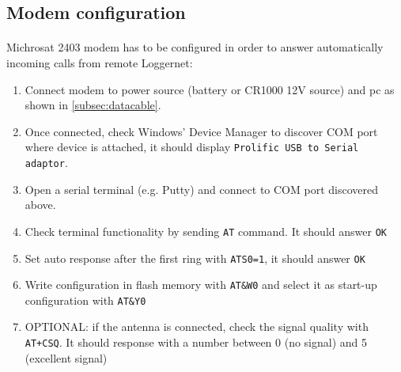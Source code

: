 \subsection{Modem configuration}
\paragraph{} Michrosat 2403 modem has to be configured in order to answer automatically incoming calls from remote Loggernet:
\begin{enumerate}
	\item Connect modem to power source (battery or CR1000 12V source) and pc as shown in \ref{subsec:datacable}.
	\item Once connected, check Windows' Device Manager to discover COM port where device is attached, it should display {\tt Prolific USB to Serial adaptor}.
	\item Open a serial terminal (e.g. Putty) and connect to COM port discovered above.
	\item Check terminal functionality by sending {\tt AT} command. It should answer {\tt OK}
	\item Set auto response after the first ring with {\tt ATS0=1}, it should answer {\tt OK}
	\item Write configuration in flash memory with {\tt AT\&W0} and select it as start-up configuration with {\tt AT\&Y0}
	\item OPTIONAL: if the antenna is connected, check the signal quality with {\tt AT+CSQ}. It should response with a number between 0 (no signal) and 5 (excellent signal)
\end{enumerate}